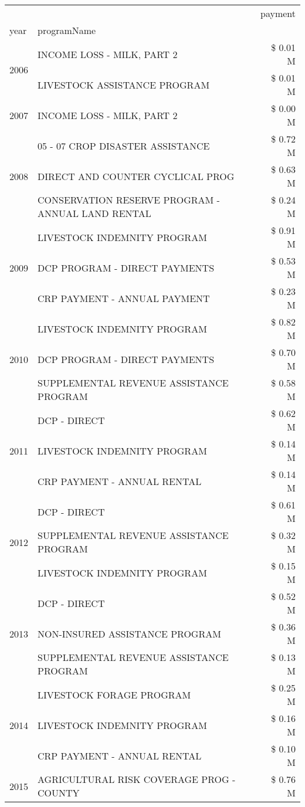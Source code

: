 \begin{tabular}{llr}
\toprule
 &  & payment \\
year & programName &  \\
\midrule
\multirow[t]{2}{*}{2006} & INCOME LOSS - MILK, PART 2 & \$ 0.01 M \\
 & LIVESTOCK ASSISTANCE PROGRAM & \$ 0.01 M \\
\cline{1-3}
2007 & INCOME LOSS - MILK, PART 2 & \$ 0.00 M \\
\cline{1-3}
\multirow[t]{3}{*}{2008} & 05 - 07 CROP DISASTER ASSISTANCE & \$ 0.72 M \\
 & DIRECT AND COUNTER CYCLICAL PROG & \$ 0.63 M \\
 & CONSERVATION RESERVE PROGRAM - ANNUAL LAND RENTAL & \$ 0.24 M \\
\cline{1-3}
\multirow[t]{3}{*}{2009} & LIVESTOCK INDEMNITY PROGRAM & \$ 0.91 M \\
 & DCP PROGRAM - DIRECT PAYMENTS & \$ 0.53 M \\
 & CRP PAYMENT - ANNUAL PAYMENT & \$ 0.23 M \\
\cline{1-3}
\multirow[t]{3}{*}{2010} & LIVESTOCK INDEMNITY PROGRAM & \$ 0.82 M \\
 & DCP PROGRAM - DIRECT PAYMENTS & \$ 0.70 M \\
 & SUPPLEMENTAL REVENUE ASSISTANCE PROGRAM & \$ 0.58 M \\
\cline{1-3}
\multirow[t]{3}{*}{2011} & DCP - DIRECT & \$ 0.62 M \\
 & LIVESTOCK INDEMNITY PROGRAM & \$ 0.14 M \\
 & CRP PAYMENT - ANNUAL RENTAL & \$ 0.14 M \\
\cline{1-3}
\multirow[t]{3}{*}{2012} & DCP - DIRECT & \$ 0.61 M \\
 & SUPPLEMENTAL REVENUE ASSISTANCE PROGRAM & \$ 0.32 M \\
 & LIVESTOCK INDEMNITY PROGRAM & \$ 0.15 M \\
\cline{1-3}
\multirow[t]{3}{*}{2013} & DCP - DIRECT & \$ 0.52 M \\
 & NON-INSURED ASSISTANCE PROGRAM & \$ 0.36 M \\
 & SUPPLEMENTAL REVENUE ASSISTANCE PROGRAM & \$ 0.13 M \\
\cline{1-3}
\multirow[t]{3}{*}{2014} & LIVESTOCK FORAGE PROGRAM & \$ 0.25 M \\
 & LIVESTOCK INDEMNITY PROGRAM & \$ 0.16 M \\
 & CRP PAYMENT - ANNUAL RENTAL & \$ 0.10 M \\
\cline{1-3}
\multirow[t]{3}{*}{2015} & AGRICULTURAL RISK COVERAGE PROG - COUNTY & \$ 0.76 M \\

\end{tabular}
